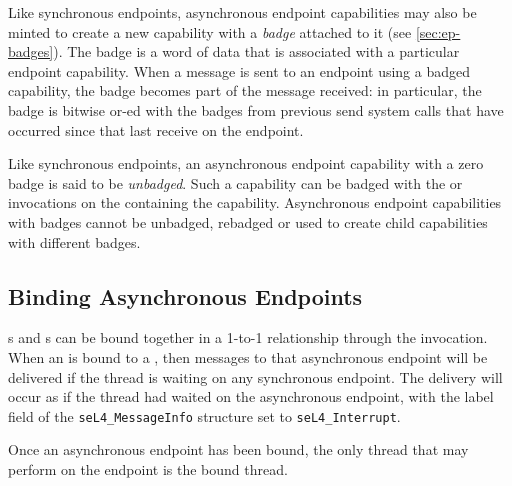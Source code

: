 Like synchronous endpoints, asynchronous endpoint capabilities may also
be minted to create a new capability with a \emph{badge} attached to it (see \autoref{sec:ep-badges}).
The badge is a word of data that is associated with a particular
endpoint capability. When a message is sent to an endpoint using
a badged capability, the badge becomes part of the message received: in
particular, the badge is bitwise or-ed with the badges from
previous send system calls that have occurred since that last receive
on the endpoint.

Like synchronous endpoints, an asynchronous endpoint capability with
a zero badge is said to be \emph{unbadged}. Such a capability can be
badged with the  or  invocations on the
 containing the capability. Asynchronous endpoint
capabilities with badges cannot be unbadged, rebadged or used to create
child capabilities with different badges.

\subsection{Binding Asynchronous Endpoints}
\label{sec:asyncep-binding}

s and s can be bound together in a 1-to-1 relationship
through the  invocation. When an
 is bound to a , then messages to that asynchronous
endpoint will be delivered if the thread is waiting on any synchronous
endpoint. The delivery will occur as if the thread had waited on the
asynchronous endpoint, with the label field of the \texttt{seL4\_MessageInfo}
structure set to \texttt{seL4\_Interrupt}.

Once an asynchronous endpoint has been bound, the only thread that may perform
 on the endpoint is the bound thread.

